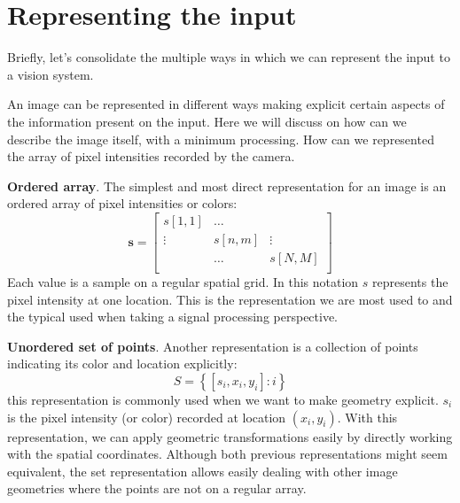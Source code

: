\chapter{Representing the input}



Briefly, let's consolidate the multiple ways in which we can represent the input to a vision system.



An image can be represented in different ways making explicit certain aspects of the information present on the input. Here we will discuss on how can we describe the image itself, with a minimum processing. How can we represented the array of pixel intensities recorded by the camera.

{\bf Ordered array}. The simplest and most direct representation for an image is an ordered array of pixel intensities or colors:
\begin{equation}
\mathbf{s} = 
\left[
\begin{matrix}
s [1,1] & \dots & \\
\vdots & s [n,m] & \vdots \\
 & \dots  & s [N,M] \\
\end{matrix}
\right]
\end{equation}
Each value is a sample on a regular spatial grid. In this notation $s$ represents the pixel intensity at one location. This is the representation we are most used to and the typical used when taking a signal processing perspective.

{\bf Unordered set of points}. Another representation is a collection of points indicating its color and location explicitly:
\begin{equation}
S = \left\{ [s_i,x_i,y_i] : i \right\}
\end{equation}
this representation is commonly used when we want to make geometry explicit. $s_i$ is the pixel intensity (or color) recorded at location $(x_i,y_i)$. With this representation, we can apply geometric transformations easily by directly working with the spatial coordinates. Although both previous representations might seem equivalent, the set representation allows easily dealing with other image geometries where the points are not on a regular array. 

